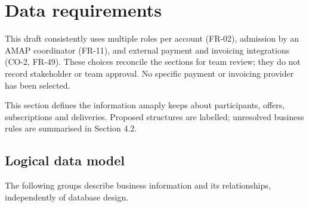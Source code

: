 \documentclass[11pt,a4paper]{article}
\begin{document}
\section{Data requirements}

This draft consistently uses multiple roles per account (FR-02), admission by an AMAP coordinator (FR-11), and external payment and invoicing integrations (CO-2, FR-49). These choices reconcile the sections for team review; they do not record stakeholder or team approval. No specific payment or invoicing provider has been selected.



This section defines the information amaply keeps about participants, offers, subscriptions and deliveries. Proposed structures are labelled; unresolved business rules are summarised in Section 4.2.


\subsection{Logical data model}

The following groups describe business information and its relationships, independently of database design.
\end{document}
